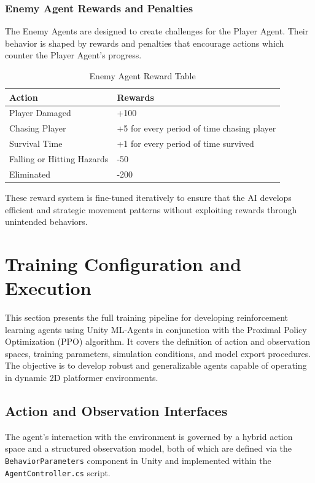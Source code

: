\documentclass[12pt,oneside,openright,a4paper]{cpe-english-project}
\begin{document}
\subsubsection{Enemy Agent Rewards and Penalties}
The Enemy Agents are designed to create challenges for the Player Agent. Their behavior is shaped by rewards and penalties that encourage actions which counter the Player Agent's progress.\par
\begin{table}[!h]
\caption{Enemy Agent Reward Table}\label{tbl:Enemy Agent Reward Table}
\begin{tabular}{|l|l|} \hline
\textbf{Action} & \textbf{Rewards} \\ \hline
Player Damaged & +100  \\ 
Chasing Player & +5  for every period of time chasing player \\ 
Survival Time & +1 for every period of time survived \\
Falling or Hitting Hazards & -50 \\ 
Eliminated & -200 \\ \hline
\end{tabular}
\end{table}
These reward system is fine-tuned iteratively to ensure that the AI develops efficient and strategic movement patterns without exploiting rewards through unintended behaviors.\par

\section{Training Configuration and Execution}

This section presents the full training pipeline for developing reinforcement learning agents using Unity ML-Agents in conjunction with the Proximal Policy Optimization (PPO) algorithm. It covers the definition of action and observation spaces, training parameters, simulation conditions, and model export procedures. The objective is to develop robust and generalizable agents capable of operating in dynamic 2D platformer environments.

\subsection{Action and Observation Interfaces}

The agent's interaction with the environment is governed by a hybrid action space and a structured observation model, both of which are defined via the \texttt{BehaviorParameters} component in Unity and implemented within the \texttt{AgentController.cs} script.
\end{document}
